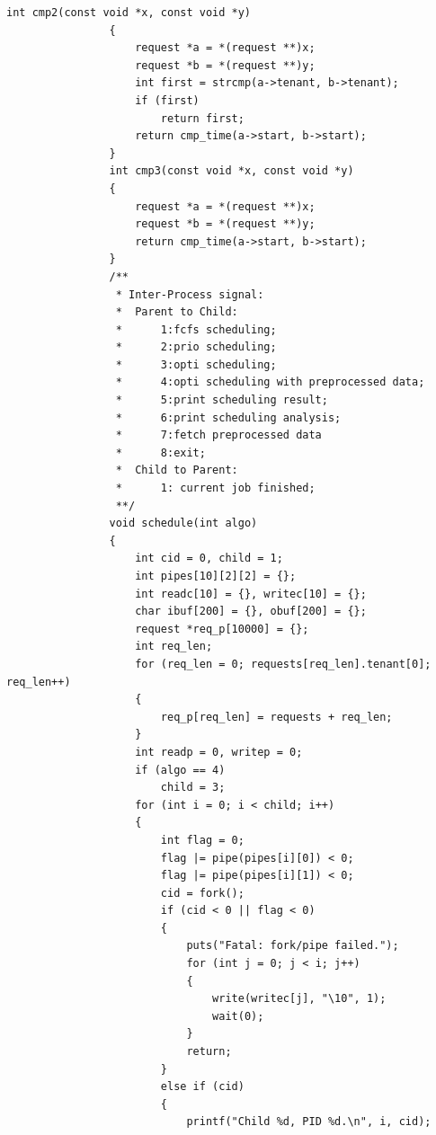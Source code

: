 \documentclass{article}
\begin{document}
\begin{Verbatim}[gobble=8]
                int cmp2(const void *x, const void *y)
                {
                    request *a = *(request **)x;
                    request *b = *(request **)y;
                    int first = strcmp(a->tenant, b->tenant);
                    if (first)
                        return first;
                    return cmp_time(a->start, b->start);
                }
                int cmp3(const void *x, const void *y)
                {
                    request *a = *(request **)x;
                    request *b = *(request **)y;
                    return cmp_time(a->start, b->start);
                }
                /**
                 * Inter-Process signal:
                 *  Parent to Child:
                 *      1:fcfs scheduling;
                 *      2:prio scheduling;
                 *      3:opti scheduling;
                 *      4:opti scheduling with preprocessed data;
                 *      5:print scheduling result;
                 *      6:print scheduling analysis;
                 *      7:fetch preprocessed data
                 *      8:exit;
                 *  Child to Parent:
                 *      1: current job finished;
                 **/
                void schedule(int algo)
                {
                    int cid = 0, child = 1;
                    int pipes[10][2][2] = {};
                    int readc[10] = {}, writec[10] = {};
                    char ibuf[200] = {}, obuf[200] = {};
                    request *req_p[10000] = {};
                    int req_len;
                    for (req_len = 0; requests[req_len].tenant[0]; req_len++)
                    {
                        req_p[req_len] = requests + req_len;
                    }
                    int readp = 0, writep = 0;
                    if (algo == 4)
                        child = 3;
                    for (int i = 0; i < child; i++)
                    {
                        int flag = 0;
                        flag |= pipe(pipes[i][0]) < 0;
                        flag |= pipe(pipes[i][1]) < 0;
                        cid = fork();
                        if (cid < 0 || flag < 0)
                        {
                            puts("Fatal: fork/pipe failed.");
                            for (int j = 0; j < i; j++)
                            {
                                write(writec[j], "\10", 1);
                                wait(0);
                            }
                            return;
                        }
                        else if (cid)
                        {
                            printf("Child %d, PID %d.\n", i, cid);

\end{Verbatim}
\end{document}
